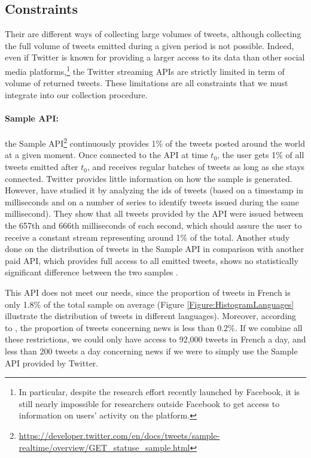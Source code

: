 \subsection{Constraints}
Their are different ways of collecting large volumes of tweets, although collecting the full volume of tweets emitted during a given period is not possible. Indeed, even if Twitter is known for providing a larger access to its data than other social media platforms,\footnote{In particular, despite the research effort recently launched by Facebook, it is still nearly impossible for researchers outside Facebook to get access to information on users' activity on the platform.} the Twitter streaming APIs are strictly limited in term of volume of returned tweets. These limitations are all constraints that we must integrate into our collection procedure.
	
	


\paragraph{Sample API:}

the Sample API\footnote{\url{https://developer.twitter.com/en/docs/tweets/sample-realtime/overview/GET_statuse_sample.html}} continuously provides 1\% of the tweets posted around the world at a given moment. Once connected to the API at time $t_0$, the user gets 1\% of all tweets emitted after $t_0$, and receives regular batches of tweets as long as she stays connected. Twitter provides little information on how the sample is generated. However,  \citet{kergl_endogenesis_2014} have studied it by analyzing the ids of tweets (based on a timestamp in milliseconds and on a number of series to identify tweets issued during the same millisecond). They show that all tweets provided by the API were issued between the 657th and 666th milliseconds of each second, which should assure the user to receive a constant stream representing around 1\% of the total. Another study done on the distribution of tweets in the Sample API in comparison with another paid API, which provides full access to all emitted tweets, shows no statistically significant difference between the two samples \citep{morstatter_when_2014}.


This API does not meet our needs, since the proportion of tweets in French is only 1.8\% of the total sample on average (Figure \ref{Figure:HistogramLanguages} illustrate the distribution of tweets in different languages). Moreover, according to \citet{liu_reuters_2016}, the proportion of tweets concerning news is less than 0.2\%. If we combine all these restrictions, we could only have access to 92,000 tweets in French a day, and less than 200 tweets a day concerning news if we were to simply use the Sample API provided by Twitter.

